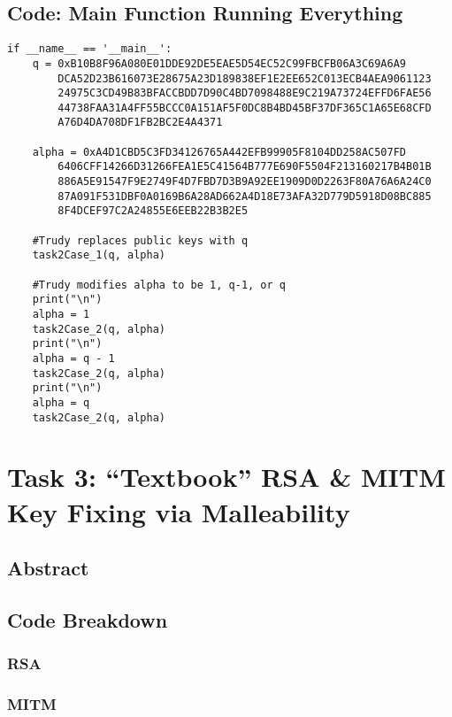 \documentclass[11pt]{article}
\begin{document}
\subsection*{Code: Main Function Running Everything}

\begin{lstlisting}
if __name__ == '__main__':
    q = 0xB10B8F96A080E01DDE92DE5EAE5D54EC52C99FBCFB06A3C69A6A9
		DCA52D23B616073E28675A23D189838EF1E2EE652C013ECB4AEA9061123
		24975C3CD49B83BFACCBDD7D90C4BD7098488E9C219A73724EFFD6FAE56
		44738FAA31A4FF55BCCC0A151AF5F0DC8B4BD45BF37DF365C1A65E68CFD
		A76D4DA708DF1FB2BC2E4A4371

    alpha = 0xA4D1CBD5C3FD34126765A442EFB99905F8104DD258AC507FD
		6406CFF14266D31266FEA1E5C41564B777E690F5504F213160217B4B01B
		886A5E91547F9E2749F4D7FBD7D3B9A92EE1909D0D2263F80A76A6A24C0
		87A091F531DBF0A0169B6A28AD662A4D18E73AFA32D779D5918D08BC885
		8F4DCEF97C2A24855E6EEB22B3B2E5

    #Trudy replaces public keys with q
    task2Case_1(q, alpha)

    #Trudy modifies alpha to be 1, q-1, or q
    print("\n")
    alpha = 1
    task2Case_2(q, alpha)
    print("\n")
    alpha = q - 1
    task2Case_2(q, alpha)
    print("\n")
    alpha = q   
    task2Case_2(q, alpha)
\end{lstlisting}


\section*{Task 3: ``Textbook'' RSA \& MITM Key Fixing via Malleability}
\subsection*{Abstract}

\subsection*{Code Breakdown}
\subsubsection*{RSA}
\subsubsection*{MITM}
\end{document}
